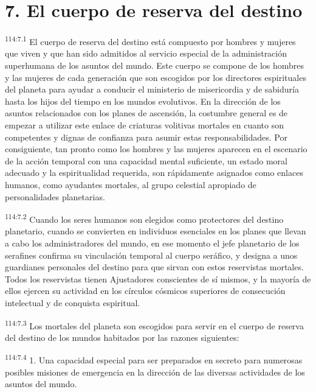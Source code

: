 \section*{7. El cuerpo de reserva del destino}
\par
\textsuperscript{114:7.1} El cuerpo de reserva del destino está compuesto por hombres y mujeres que viven y que han sido admitidos al servicio especial de la administración superhumana de los asuntos del mundo. Este cuerpo se compone de los hombres y las mujeres de cada generación que son escogidos por los directores espirituales del planeta para ayudar a conducir el ministerio de misericordia y de sabiduría hasta los hijos del tiempo en los mundos evolutivos. En la dirección de los asuntos relacionados con los planes de ascensión, la costumbre general es de empezar a utilizar este enlace de criaturas volitivas mortales en cuanto son competentes y dignas de confianza para asumir estas responsabilidades. Por consiguiente, tan pronto como los hombres y las mujeres aparecen en el escenario de la acción temporal con una capacidad mental suficiente, un estado moral adecuado y la espiritualidad requerida, son rápidamente asignados como enlaces humanos, como ayudantes mortales, al grupo celestial apropiado de personalidades planetarias.

\par
\textsuperscript{114:7.2} Cuando los seres humanos son elegidos como protectores del destino planetario, cuando se convierten en individuos esenciales en los planes que llevan a cabo los administradores del mundo, en ese momento el jefe planetario de los serafines confirma su vinculación temporal al cuerpo seráfico, y designa a unos guardianes personales del destino para que sirvan con estos reservistas mortales. Todos los reservistas tienen Ajustadores conscientes de sí mismos, y la mayoría de ellos ejercen su actividad en los círculos cósmicos superiores de consecución intelectual y de conquista espiritual.

\par
\textsuperscript{114:7.3} Los mortales del planeta son escogidos para servir en el cuerpo de reserva del destino de los mundos habitados por las razones siguientes:

\par
\textsuperscript{114:7.4} 1. Una capacidad especial para ser preparados en secreto para numerosas posibles misiones de emergencia en la dirección de las diversas actividades de los asuntos del mundo.

